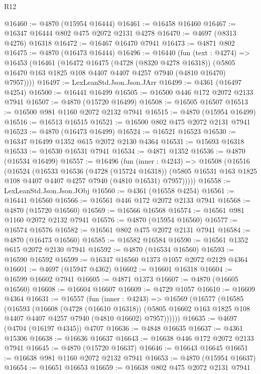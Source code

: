\begin{lexlean}{R12}
\begin{coremodule}
@16460 := @4870 (@15954 @16444)
@16461 := @16458 @16460
@16467 := @16347 @16444 @802 @475 @2072 @2131 @4278
@16470 := @4697 (@8313 @4276) @16318
@16472 := @16467 @16470 @7941
@16473 := @4871 @802
@16475 := @4870 (@16473 @16444)
@16496 := @16440
    (fun (text : @4274) =>
    @16453
      (@16461
        (@16472
          @16475
          (@4728 (@8320 @4278 @16318))
          (@5805 @16470 @163 @1825 @108 @4407 @4407 @4257 @7940 (@4810 @16470) @7957))))
@16497 := LexLeanStd.Json.Json.JArr
@16499 := @4361 (@16497 @4254)
@16500 := @16441 @16499
@16505 := @16500 @446 @172 @2072 @2133 @7941
@16507 := @4870 (@15720 @16499)
@16508 := @16505 @16507
@16513 := @16500 @981 @1160 @2072 @2132 @7941
@16515 := @4870 (@15954 @16499)
@16516 := @16513 @16515
@16521 := @16500 @802 @475 @2072 @2131 @7941
@16523 := @4870 (@16473 @16499)
@16524 := @16521 @16523
@16530 := @16347 @16499 @1352 @615 @2072 @2130 @4364
@16531 := @15693 @16318
@16533 := @16530 @16531 @7941
@16534 := @4871 @1352
@16536 := @4870 (@16534 @16499)
@16557 := @16496
    (fun (inner : @4243) =>
    @16508
      (@16516
        (@16524
          (@16533
            @16536
            (@4728 (@15724 @16318))
            (@5805 @16531 @163 @1825 @108 @4407 @4407 @4257 @7940 (@4810 @16531) @7957)))))
@16558 := LexLeanStd.Json.Json.JObj
@16560 := @4361 (@16558 @4254)
@16561 := @16441 @16560
@16566 := @16561 @446 @172 @2072 @2133 @7941
@16568 := @4870 (@15720 @16560)
@16569 := @16566 @16568
@16574 := @16561 @981 @1160 @2072 @2132 @7941
@16576 := @4870 (@15954 @16560)
@16577 := @16574 @16576
@16582 := @16561 @802 @475 @2072 @2131 @7941
@16584 := @4870 (@16473 @16560)
@16585 := @16582 @16584
@16590 := @16561 @1352 @615 @2072 @2130 @7941
@16592 := @4870 (@16534 @16560)
@16593 := @16590 @16592
@16599 := @16347 @16560 @1373 @1057 @2072 @2129 @4364
@16601 := @4697 (@15947 @4362)
@16602 := @16601 @16318
@16604 := @16599 @16602 @7941
@16605 := @4871 @1373
@16607 := @4870 (@16605 @16560)
@16608 := @16604 @16607
@16609 := @4729 @1057
@16610 := @16609 @4364
@16631 := @16557
    (fun (inner : @4243) =>
    @16569
      (@16577
        (@16585
          (@16593
            (@16608
              (@4728 (@16610 @16318))
              (@5805 @16602 @163 @1825 @108 @4407 @4407 @4257 @7940 (@4810 @16602) @7957))))))
@16635 := @4697 (@4704 (@16197 @4345)) @4707
@16636 := @4848 @16635
@16637 := @4361 @15306
@16638 := @16636 @16637
@16643 := @16638 @446 @172 @2072 @2133 @7941
@16645 := @4870 (@15720 @16637)
@16646 := @16643 @16645
@16651 := @16638 @981 @1160 @2072 @2132 @7941
@16653 := @4870 (@15954 @16637)
@16654 := @16651 @16653
@16659 := @16638 @802 @475 @2072 @2131 @7941

\end{coremodule}
\end{lexlean}
